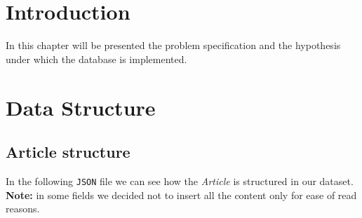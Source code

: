 \documentclass{Configuration_Files/PoliMi3i_thesis}
\begin{document}
\mainmatter %

\chapter{Introduction}
\label{ch:introduction}
In this chapter will be presented the problem specification and the hypothesis under which the database is implemented.


\chapter{Data Structure}
\label{ch:data_struct}
\section{Article structure}
In the following \verb |JSON| file we can see how the \emph{Article} is structured in our dataset.\newline
\textbf{Note:} in some fields we decided not to insert all the content only for ease of read reasons.\newline
\end{document}
